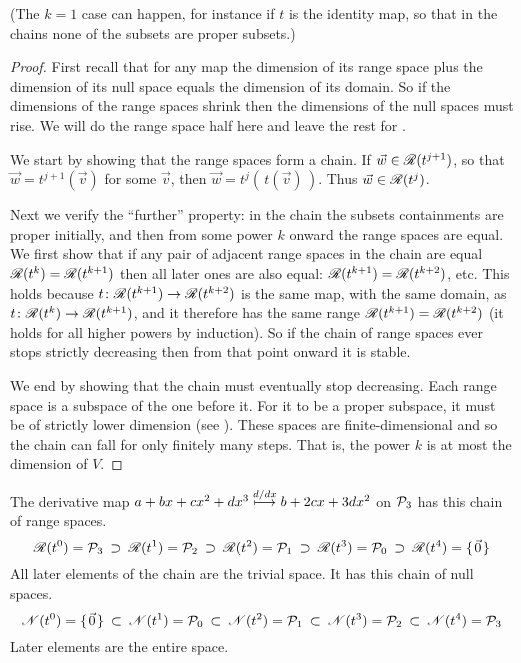 \noindent (The $k=1$ case can happen, for instance if $t$ is the identity map,
so that in the chains none of the subsets are proper subsets.)

\begin{proof}
First recall that for any map the dimension of its range space
plus the dimension of its null space equals
the dimension of its domain.
So if the dimensions of the range spaces shrink then the 
dimensions of the null spaces must rise.
We will do the range space half here and leave the rest for
.

We start by showing 
that the range spaces form a chain.
If $\vec{w}\in\mathscr{R}(t^{j+1})$, so that
$\vec{w}=t^{j+1}(\vec{v})$ for some $\vec{v}$, 
then $\vec{w}=t^{j}(\,t(\vec{v})\,)$.
Thus $\vec{w}\in\mathscr{R}(t^{j})$.

Next we verify the ``further'' property:
in the chain the subsets containments are proper 
initially, and then from some power $k$ onward the range spaces are equal. 
We first show that if any pair of adjacent range spaces in the
chain are equal \( \mathscr{R}(t^{k})=\mathscr{R}(t^{k+1}) \)
then all later ones are also equal:
\( \mathscr{R}(t^{k+1})=\mathscr{R}(t^{k+2}) \), etc.
This holds because
\( \mbox{$t\colon \mathscr{R}(t^{k+1})\to \mathscr{R}(t^{k+2})$} \)
is the same map, with the same domain, as
\( \mbox{$t\colon \mathscr{R}(t^{k})\to \mathscr{R}(t^{k+1})$} \), and
it therefore has the same range
\( \mathscr{R}(t^{k+1})=\mathscr{R}(t^{k+2}) \)
(it holds for all higher powers by induction).
So if the chain of range spaces ever stops strictly decreasing then
from that point onward it is stable.

We end by showing that the chain must eventually stop decreasing. 
Each range space is a subspace of the one before it.
For it to be a proper subspace, it must be of strictly lower dimension
(see ).
These spaces are finite-dimensional and so the chain can fall for only
finitely many steps.
That is, the power $k$ is at most the dimension of $V$.
\end{proof}

\begin{example}
The derivative map $a+bx+cx^2+dx^3\stackrel{d/dx}{\longmapsto} b+2cx+3dx^2$
on $\mathcal{P}_3$ has this chain of range spaces.
\begin{equation*}
  \mathscr{R}(t^0)=\mathcal{P}_3
    \:\supset\:\mathscr{R}(t^1)=\mathcal{P}_2
    \:\supset\:\mathscr{R}(t^2)=\mathcal{P}_1
    \:\supset\:\mathscr{R}(t^3)=\mathcal{P}_0
    \:\supset\:\mathscr{R}(t^4)=\mbox{$\{\hspace{0.1em}\vec{0}\hspace{0.1em}\}$}
\end{equation*}
All later elements of the chain are the trivial space. 
It has this chain of null spaces.
\begin{equation*}
  \mathscr{N}(t^0)=\mbox{$\{\hspace{0.1em}\vec{0}\hspace{0.1em}\}$}
  \:\subset\: \mathscr{N}(t^1)=\mathcal{P}_0
  \:\subset\:\mathscr{N}(t^2)=\mathcal{P}_1
  \:\subset\:\mathscr{N}(t^3)=\mathcal{P}_2
  \:\subset\:\mathscr{N}(t^4)=\mathcal{P}_3
\end{equation*}
Later elements are the entire space.
\end{example}

